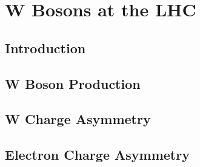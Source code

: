 
\chapter{W Bosons at the \ac{LHC}}

\section{Introduction}
\section{W Boson Production}
\section{W Charge Asymmetry}
\section{Electron Charge Asymmetry}

